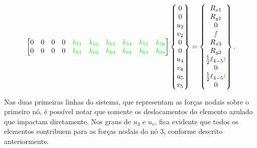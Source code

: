 \begin{landscape}
\begin{equation}
\begin{bmatrix}
                0                        & 0                         & 0                                                   & 0                                                     &  \textcolor{green}{k_{51}}                                                      &  \textcolor{green}{k_{52}}                                                      &  \textcolor{green}{k_{53}}                           &  \textcolor{green}{k_{54}}                           &  \textcolor{green}{k_{55}} &  \textcolor{green}{k_{56}} \\
                0                        & 0                         & 0                                                   & 0                                                     &  \textcolor{green}{k_{61}}                                                      &  \textcolor{green}{k_{62}}                                                      &  \textcolor{green}{k_{63}}                           &  \textcolor{green}{k_{64}}                           &  \textcolor{green}{k_{65}} &  \textcolor{green}{k_{66}} 
            \end{bmatrix}
            \begin{Bmatrix}
                0 \\ 0 \\ u_2 \\ v_2 \\ 0 \\ 0 \\ u_4 \\ v_4 \\ u_5 \\ v_5
            \end{Bmatrix} = 
            \begin{Bmatrix}
                R_{x1} \\ R_{y1} \\ 0 \\ \textcolor{purple}{f} \\ R_{x3} \\ R_{y3} \\ \frac{1}{2} \ell_{4-5} \textcolor{orange}{t} \\ 0 \\ \frac{1}{2} \ell_{4-5} \textcolor{orange}{t} \\ 0
            \end{Bmatrix}.
        \label{eq:sistema_global_montado}
    \end{equation}
\end{landscape}
Nas duas primeiras linhas do sistema, que representam as forças nodais sobre o primeiro nó, é possível notar que somente os deslocamentos do elemento azulado que impactam diretamente. Nos graus de $u_3$ e $u_v$, fica evidente que todos os elementos contribuem para as forças nodais do nó $3$, conforme descrito anteriormente.

